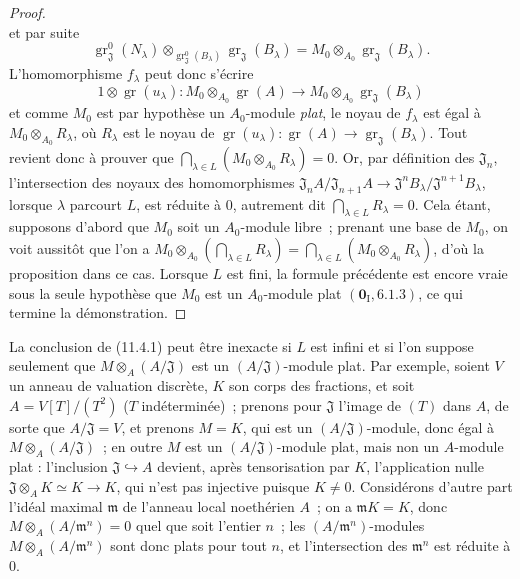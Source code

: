 \begin{proof}
\[\]
et par suite
\[
\operatorname{gr}_{\mathfrak J}^0(N_\lambda)
\otimes_{\operatorname{gr}_{\mathfrak J}^0(B_\lambda)}
\operatorname{gr}_{\mathfrak J}(B_\lambda)
=M_0\otimes_{A_0}\operatorname{gr}_{\mathfrak J}(B_\lambda).
\]
L'homomorphisme $f_\lambda$ peut donc s'écrire
\[
1\otimes\operatorname{gr}(u_\lambda):
M_0\otimes_{A_0}\operatorname{gr}(A)
\longrightarrow M_0\otimes_{A_0}\operatorname{gr}_{\mathfrak J}(B_\lambda)
\]
et comme $M_0$ est par hypothèse un $A_0$-module \emph{plat}, le noyau de
$f_\lambda$ est égal à $M_0\otimes_{A_0}R_\lambda$, où $R_\lambda$ est le
noyau de
$\operatorname{gr}(u_\lambda):\operatorname{gr}(A)
\to\operatorname{gr}_{\mathfrak J}(B_\lambda)$. Tout revient donc à prouver
que
$\bigcap_{\lambda\in L}(M_0\otimes_{A_0}R_\lambda)=0$.
Or, par définition des $\mathfrak J_n$, l'intersection des noyaux des
homomorphismes
$\mathfrak J_nA/\mathfrak J_{n+1}A
\longrightarrow\mathfrak J^nB_\lambda/\mathfrak J^{n+1}B_\lambda$,
lorsque $\lambda$ parcourt $L$, est réduite à $0$, autrement dit
$\bigcap_{\lambda\in L}R_\lambda=0$. Cela étant, supposons d'abord que $M_0$
soit un $A_0$-module libre~; prenant une base de $M_0$, on voit aussitôt que
l'on a
$M_0\otimes_{A_0}(\bigcap_{\lambda\in L}R_\lambda)
=\bigcap_{\lambda\in L}(M_0\otimes_{A_0}R_\lambda)$,
d'où la proposition dans ce cas. Lorsque $L$ est fini, la formule précédente
est encore vraie sous la seule hypothèse que $M_0$ est un $A_0$-module plat
$(\mathbf 0_{\mathrm I},6.1.3)$, ce qui termine la démonstration.
\end{proof}

\begin{remark}[11.4.2]
\label{IV.11.4.2-fr}
La conclusion de (11.4.1) peut être inexacte si $L$ est infini et si l'on
suppose seulement que $M\otimes_A(A/\mathfrak J)$ est un
$(A/\mathfrak J)$-module plat. Par exemple, soient $V$ un anneau de valuation
discrète, $K$ son corps des fractions, et soit $A=V[T]/(T^2)$ ($T$
indéterminée)~; prenons pour $\mathfrak J$ l'image de $(T)$ dans $A$, de sorte
que $A/\mathfrak J=V$, et prenons $M=K$, qui est un
$(A/\mathfrak J)$-module, donc égal à $M\otimes_A(A/\mathfrak J)$~; en outre
$M$ est un $(A/\mathfrak J)$-module plat, mais non un $A$-module plat :
l'inclusion $\mathfrak J\hookrightarrow A$ devient, après tensorisation par $K$,
l'application nulle $\mathfrak J\otimes_A K\simeq K\longrightarrow K$,
qui n'est pas injective puisque $K\neq0$. Considérons d'autre part l'idéal maximal
$\mathfrak m$ de l'anneau local noethérien $A$~; on a $\mathfrak mK=K$, donc
$M\otimes_A(A/\mathfrak m^n)=0$ quel que soit l'entier $n$~; les
$(A/\mathfrak m^n)$-modules $M\otimes_A(A/\mathfrak m^n)$ sont donc plats pour
tout $n$, et l'intersection des $\mathfrak m^n$ est réduite à $0$.
\end{remark}


